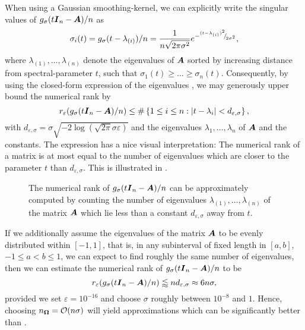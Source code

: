 When using a Gaussian smoothing-kernel, we can explicitly write the singular values of $g_{\sigma}(t\boldsymbol{I}_n - \boldsymbol{A}) / n$ as
\begin{equation}
    \sigma_i(t) = g_{\sigma}(t - \lambda_{(i)}) / n = \frac{1}{n \sqrt{2 \pi \sigma^2}} e^{-{}^{(t - \lambda_{(i)})^2}{\mskip -5mu/\mskip -3mu}_{2 \sigma^2}},
    \label{equ:gaussian-kernel-eigenvalues}
\end{equation}
where $\lambda_{(1)}, \dots, \lambda_{(n)}$ denote the eigenvalues of $\boldsymbol{A}$ sorted by increasing distance from spectral-parameter $t$, such that $\sigma_1(t) \geq \dots \geq \sigma_n(t)$. Consequently, by using the closed-form expression of the eigenvalues , we may generously upper bound the numerical rank by
\begin{equation}
    r_{\varepsilon}(g_{\sigma}(t\boldsymbol{I}_n - \boldsymbol{A}) / n) \leq \#\left\{1\leq i\leq n: |t - \lambda_i| < d_{\varepsilon, \sigma} \right\},
    \label{equ:gaussian-kernel-numerical-rank}
\end{equation}
with $d_{\varepsilon, \sigma} = \sigma \sqrt{-2 \log(\sqrt{2 \pi} \sigma \varepsilon)}$ and the eigenvalues $\lambda_1, \dots, \lambda_n$ of $\boldsymbol{A}$ and the constants. The expression  has a nice visual interpretation: The numerical rank of a matrix is at most equal to the number of eigenvalues which are closer to the parameter $t$ than $d_{\varepsilon, \sigma}$. This is illustrated in .
\begin{figure}[ht]
    \centering
    
    \caption{The numerical rank of $g_{\sigma}(t\boldsymbol{I}_n - \boldsymbol{A}) / n$ can be approximately computed by counting the number of eigenvalues $\lambda_{(1)}, \dots, \lambda_{(n)}$ of the matrix $\boldsymbol{A}$ which lie less than a constant $d_{\varepsilon, \sigma}$ away from $t$.}
    \label{fig:numerical-rank}
\end{figure}

If we additionally assume the eigenvalues of the matrix $\boldsymbol{A}$ to be evenly distributed within $[-1, 1]$, that is, in any subinterval of fixed length in $[a, b]$, $-1 \leq a < b \leq 1$, we can expect to find roughly the same number of eigenvalues, then we can estimate the numerical rank of $g_{\sigma}(t\boldsymbol{I}_n - \boldsymbol{A}) / n$ to be
\begin{equation}
    r_{\varepsilon}(g_{\sigma}(t\boldsymbol{I}_n - \boldsymbol{A}) / n) \lessapprox n d_{\varepsilon, \sigma} \approx 6 n \sigma,
    \label{equ:gaussian-kernel-numerical-rank-uniform}
\end{equation}
provided we set $\varepsilon = 10^{-16}$ and choose $\sigma$ roughly between $10^{-8}$ and $1$. Hence, choosing $n_{\boldsymbol{\Omega}} = \mathcal{O}(n \sigma)$ will yield approximations which can be significantly better than .
